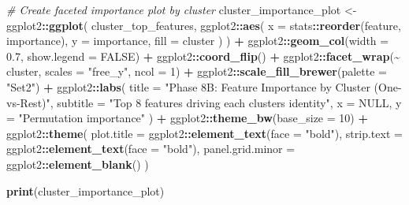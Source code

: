 \documentclass[
]{article}
\newenvironment{Shaded}{\begin{snugshade}}{\end{snugshade}}
\newcommand{\AttributeTok}[1]{\textcolor[rgb]{0.13,0.29,0.53}{#1}}
\newcommand{\CommentTok}[1]{\textcolor[rgb]{0.56,0.35,0.01}{\textit{#1}}}
\newcommand{\ConstantTok}[1]{\textcolor[rgb]{0.56,0.35,0.01}{#1}}
\newcommand{\DecValTok}[1]{\textcolor[rgb]{0.00,0.00,0.81}{#1}}
\newcommand{\FloatTok}[1]{\textcolor[rgb]{0.00,0.00,0.81}{#1}}
\newcommand{\FunctionTok}[1]{\textcolor[rgb]{0.13,0.29,0.53}{\textbf{#1}}}
\newcommand{\NormalTok}[1]{#1}
\newcommand{\OtherTok}[1]{\textcolor[rgb]{0.56,0.35,0.01}{#1}}
\newcommand{\SpecialCharTok}[1]{\textcolor[rgb]{0.81,0.36,0.00}{\textbf{#1}}}
\newcommand{\StringTok}[1]{\textcolor[rgb]{0.31,0.60,0.02}{#1}}
\begin{document}
\begin{Shaded}
\begin{Highlighting}[]
\CommentTok{\# Create faceted importance plot by cluster}
\NormalTok{cluster\_importance\_plot }\OtherTok{\textless{}{-}}\NormalTok{ ggplot2}\SpecialCharTok{::}\FunctionTok{ggplot}\NormalTok{(}
\NormalTok{  cluster\_top\_features,}
\NormalTok{  ggplot2}\SpecialCharTok{::}\FunctionTok{aes}\NormalTok{(}
    \AttributeTok{x    =}\NormalTok{ stats}\SpecialCharTok{::}\FunctionTok{reorder}\NormalTok{(feature, importance),}
    \AttributeTok{y    =}\NormalTok{ importance,}
    \AttributeTok{fill =}\NormalTok{ cluster}
\NormalTok{  )}
\NormalTok{) }\SpecialCharTok{+}
\NormalTok{  ggplot2}\SpecialCharTok{::}\FunctionTok{geom\_col}\NormalTok{(}\AttributeTok{width =} \FloatTok{0.7}\NormalTok{, }\AttributeTok{show.legend =} \ConstantTok{FALSE}\NormalTok{) }\SpecialCharTok{+}
\NormalTok{  ggplot2}\SpecialCharTok{::}\FunctionTok{coord\_flip}\NormalTok{() }\SpecialCharTok{+}
\NormalTok{  ggplot2}\SpecialCharTok{::}\FunctionTok{facet\_wrap}\NormalTok{(}\SpecialCharTok{\textasciitilde{}}\NormalTok{ cluster, }\AttributeTok{scales =} \StringTok{"free\_y"}\NormalTok{, }\AttributeTok{ncol =} \DecValTok{1}\NormalTok{) }\SpecialCharTok{+}
\NormalTok{  ggplot2}\SpecialCharTok{::}\FunctionTok{scale\_fill\_brewer}\NormalTok{(}\AttributeTok{palette =} \StringTok{"Set2"}\NormalTok{) }\SpecialCharTok{+}
\NormalTok{  ggplot2}\SpecialCharTok{::}\FunctionTok{labs}\NormalTok{(}
    \AttributeTok{title    =} \StringTok{"Phase 8B: Feature Importance by Cluster (One{-}vs{-}Rest)"}\NormalTok{,}
    \AttributeTok{subtitle =} \StringTok{"Top 8 features driving each cluster\textquotesingle{}s identity"}\NormalTok{,}
    \AttributeTok{x        =} \ConstantTok{NULL}\NormalTok{,}
    \AttributeTok{y        =} \StringTok{"Permutation importance"}
\NormalTok{  ) }\SpecialCharTok{+}
\NormalTok{  ggplot2}\SpecialCharTok{::}\FunctionTok{theme\_bw}\NormalTok{(}\AttributeTok{base\_size =} \DecValTok{10}\NormalTok{) }\SpecialCharTok{+}
\NormalTok{  ggplot2}\SpecialCharTok{::}\FunctionTok{theme}\NormalTok{(}
    \AttributeTok{plot.title       =}\NormalTok{ ggplot2}\SpecialCharTok{::}\FunctionTok{element\_text}\NormalTok{(}\AttributeTok{face =} \StringTok{"bold"}\NormalTok{),}
    \AttributeTok{strip.text       =}\NormalTok{ ggplot2}\SpecialCharTok{::}\FunctionTok{element\_text}\NormalTok{(}\AttributeTok{face =} \StringTok{"bold"}\NormalTok{),}
    \AttributeTok{panel.grid.minor =}\NormalTok{ ggplot2}\SpecialCharTok{::}\FunctionTok{element\_blank}\NormalTok{()}
\NormalTok{  )}

\FunctionTok{print}\NormalTok{(cluster\_importance\_plot)}
\end{Highlighting}
\end{Shaded}
\end{document}

